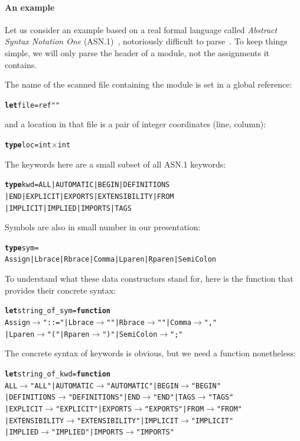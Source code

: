 \paragraph{An example}

Let us consider an example based on a real formal language called
\emph{Abstract Syntax Notation One} (ASN.1)~\citep{Larmouth_1999,
  Dubuisson_2001}, notoriously difficult to
parse~\citep{Rinderknecht_1995}. To keep things simple, we will only
parse the header of a module, not the assignments it contains.

The name of the scanned file containing the module is set in a global
reference:
\begin{alltt}
\textbf{let} file = ref ""
\end{alltt}
and a location in that file is a pair of integer coordinates (line,
column):
\begin{alltt}
\textbf{type} loc = int \(\times\) int
\end{alltt}
The keywords here are a small subset of all ASN.1 keywords:
\begin{alltt}
\textbf{type} kwd = ALL | AUTOMATIC | BEGIN | DEFINITIONS
| END | EXPLICIT | EXPORTS | EXTENSIBILITY | FROM
| IMPLICIT | IMPLIED | IMPORTS | TAGS
\end{alltt}
Symbols are also in small number in our presentation:
\begin{alltt}
\textbf{type} sym =
  Assign | Lbrace | Rbrace | Comma | Lparen | Rparen | SemiColon
\end{alltt}
To understand what these data constructors stand for, here is the
function that provides their concrete syntax:
\begin{alltt}
\textbf{let} string\_of\_sym = \textbf{function}
  Assign \(\rightarrow\) "::=" | Lbrace \(\rightarrow\) "{" | Rbrace \(\rightarrow\) "}" | Comma \(\rightarrow\) ","
| Lparen \(\rightarrow\) "(" | Rparen \(\rightarrow\) ")" | SemiColon \(\rightarrow\) ";"
\end{alltt}
The concrete syntax of keywords is obvious, but we need a function
nonetheless:
\begin{alltt}
\textbf{let} string\_of\_kwd = \textbf{function}
  ALL \(\rightarrow\) "ALL" | AUTOMATIC \(\rightarrow\) "AUTOMATIC" | BEGIN \(\rightarrow\) "BEGIN"
| DEFINITIONS \(\rightarrow\) "DEFINITIONS" | END \(\rightarrow\) "END" | TAGS \(\rightarrow\) "TAGS"
| EXPLICIT \(\rightarrow\) "EXPLICIT" | EXPORTS \(\rightarrow\) "EXPORTS" | FROM \(\rightarrow\) "FROM"
| EXTENSIBILITY \(\rightarrow\) "EXTENSIBILITY" | IMPLICIT \(\rightarrow\) "IMPLICIT"
| IMPLIED \(\rightarrow\) "IMPLIED" | IMPORTS \(\rightarrow\) "IMPORTS"
\end{alltt}
